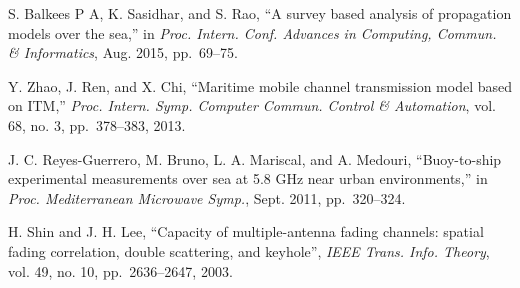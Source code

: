 \documentclass[journal]{IEEEtran}
\begin{document}
\begin{thebibliography}{10}
   
    
   
   
   S. Balkees P A, K. Sasidhar, and S. Rao, ``A survey based analysis of propagation models over the sea,'' in
   \emph{Proc. Intern. Conf. Advances in Computing, Commun. \& Informatics}, Aug. 2015, pp.~69--75.
   
   Y. Zhao, J. Ren, and X. Chi, ``Maritime mobile channel transmission model based on ITM,''
   \emph{Proc. Intern. Symp. Computer Commun. Control \& Automation}, vol. 68, no. 3, pp.~378--383, 2013.
   
   J. C. Reyes-Guerrero, M. Bruno, L. A. Mariscal, and A. Medouri, ``Buoy-to-ship experimental measurements over sea at 5.8 GHz near urban environments,'' in
   \emph{Proc. Mediterranean Microwave Symp.}, Sept. 2011, pp.~320--324.
   
   
   
    H. Shin and J. H. Lee, ``Capacity of multiple-antenna fading channels: spatial fading correlation, double scattering, and keyhole'',
    \emph{IEEE Trans. Info. Theory}, vol. 49, no. 10, pp.~2636--2647, 2003.
   
   
   
   

\end{thebibliography}
\end{document}
